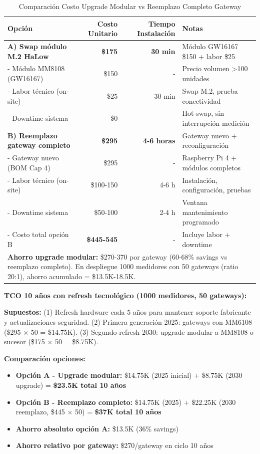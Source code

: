 \begin{table}[H]
\centering
\caption{Comparación Costo Upgrade Modular vs Reemplazo Completo Gateway}
\label{tab:upgrade-cost-comparison}
\small
\begin{tabular}{|l|r|r|p{4cm}|}
\hline
\textbf{Opción} & \textbf{Costo Unitario} & \textbf{Tiempo Instalación} & \textbf{Notas} \\
\hline
\textbf{A) Swap módulo M.2 HaLow} & \textbf{\$175} & \textbf{30 min} & Módulo GW16167 \$150 + labor \$25 \\
 \hline
 - Módulo MM8108 (GW16167) & \$150 & - & Precio volumen >100 unidades \\
 - Labor técnico (on-site) & \$25 & 30 min & Swap M.2, prueba conectividad \\
 - Downtime sistema & \$0 & - & Hot-swap, sin interrupción medición \\
\hline
\textbf{B) Reemplazo gateway completo} & \textbf{\$295} & \textbf{4-6 horas} & Gateway nuevo + reconfiguración \\
\hline
 - Gateway nuevo (BOM Cap 4) & \$295 & - & Raspberry Pi 4 + módulos completos \\
 - Labor técnico (on-site) & \$100-150 & 4-6 h & Instalación, configuración, pruebas \\
 - Downtime sistema & \$50-100 & 2-4 h & Ventana mantenimiento programado \\
 - Costo total opción B & \textbf{\$445-545} & - & Incluye labor + downtime \\
\hline
\multicolumn{4}{|p{14cm}|}{\textbf{Ahorro upgrade modular:} \$270-370 por gateway (60-68\% savings vs reemplazo completo). En despliegue 1000 medidores con 50 gateways (ratio 20:1), ahorro acumulado = \$13.5K-18.5K.} \\
\hline
\end{tabular}
\end{table}

\textbf{TCO 10 años con refresh tecnológico (1000 medidores, 50 gateways):}

\textbf{Supuestos:} (1) Refresh hardware cada 5 años para mantener soporte fabricante y actualizaciones seguridad. (2) Primera generación 2025: gateways con MM6108 (\$295 $\times$ 50 = \$14.75K). (3) Segundo refresh 2030: upgrade modular a MM8108 o sucesor (\$175 $\times$ 50 = \$8.75K).

\textbf{Comparación opciones:}
\begin{itemize}
    \item \textbf{Opción A - Upgrade modular:} \$14.75K (2025 inicial) + \$8.75K (2030 upgrade) = \textbf{\$23.5K total 10 años}
    \item \textbf{Opción B - Reemplazo completo:} \$14.75K (2025) + \$22.25K (2030 reemplazo, \$445 $\times$ 50) = \textbf{\$37K total 10 años}
    \item \textbf{Ahorro absoluto opción A:} \$13.5K (36\% savings)
    \item \textbf{Ahorro relativo por gateway:} \$270/gateway en ciclo 10 años
\end{itemize}

